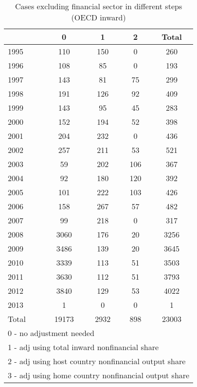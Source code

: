 \begin{table}[htbp]\centering
\caption{Cases excluding financial sector in different steps (OECD inward)}
\begin{tabular}{l*{4}{c}}
\toprule
            &           0&           1&           2&       Total\\
\midrule
1995        &         110&         150&           0&         260\\
1996        &         108&          85&           0&         193\\
1997        &         143&          81&          75&         299\\
1998        &         191&         126&          92&         409\\
1999        &         143&          95&          45&         283\\
2000        &         152&         194&          52&         398\\
2001        &         204&         232&           0&         436\\
2002        &         257&         211&          53&         521\\
2003        &          59&         202&         106&         367\\
2004        &          92&         180&         120&         392\\
2005        &         101&         222&         103&         426\\
2006        &         158&         267&          57&         482\\
2007        &          99&         218&           0&         317\\
2008        &        3060&         176&          20&        3256\\
2009        &        3486&         139&          20&        3645\\
2010        &        3339&         113&          51&        3503\\
2011        &        3630&         112&          51&        3793\\
2012        &        3840&         129&          53&        4022\\
2013        &           1&           0&           0&           1\\
Total       &       19173&        2932&         898&       23003\\
\bottomrule
\multicolumn{5}{l}{\footnotesize 0 - no adjustment needed}\\
\multicolumn{5}{l}{\footnotesize 1 - adj using total inward nonfinancial share}\\
\multicolumn{5}{l}{\footnotesize 2 - adj using host country nonfinancial output share}\\
\multicolumn{5}{l}{\footnotesize 3 - adj using home country nonfinancial output share}\\
\end{tabular}
\end{table}
